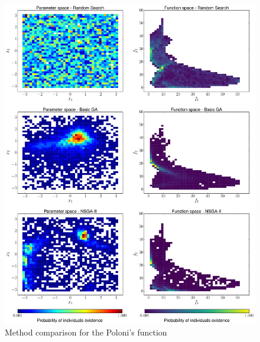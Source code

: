     \begin{figure}[H]
        \centering
        \includegraphics[height=0.96\textheight, width=\textwidth]{Figures/3/hist_POL.pdf}
        \caption{Method comparison for the Poloni's function}
        \label{fig:histogramPOL}
    \end{figure}
    
\newpage

